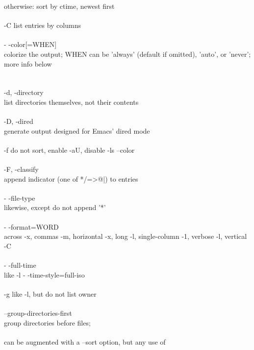 \documentclass{article}
\begin{document}
\tabto{2cm}              otherwise: sort by ctime, newest first \\
\\
\tabto{1cm}       -C     list entries by columns \\
\\
\tabto{1cm}       - -color[=WHEN] \\
\tabto{2cm}              colorize  the output; WHEN can be 'always' (default if omitted),
\tabto{2cm}              'auto', or 'never'; more info below \\
\\
\\
\tabto{1cm}       -d, \--directory \\
\tabto{2cm}              list directories themselves, not their contents \\
\\
\tabto{1cm}       -D, \--dired \\
\tabto{2cm}              generate output designed for Emacs' dired mode \\
\\
\tabto{1cm}       -f     do not sort, enable -aU, disable -ls --color \\
\\
\tabto{1cm}       -F, \--classify \\
\tabto{2cm}              append indicator (one of */=>@|) to entries \\
\\
\tabto{1cm}       - -file-type \\
\tabto{2cm}              likewise, except do not append '*' \\
\\
\tabto{1cm}       - -format=WORD \\
\tabto{2cm}              across -x, commas -m, horizontal -x, long -l, single-column  -1,
              verbose -l, vertical -C \\
\\
\tabto{1cm}       - -full-time \\
\tabto{2cm}              like -l - -time-style=full-iso \\
\\
\tabto{1cm}       -g     like -l, but do not list owner \\
\\
\tabto{1cm}       --group-directories-first \\
\tabto{2cm}              group directories before files; \\
\\
\tabto{2cm}              can   be  augmented  with  a  --sort  option,  but  any  use  of
\end{document}
